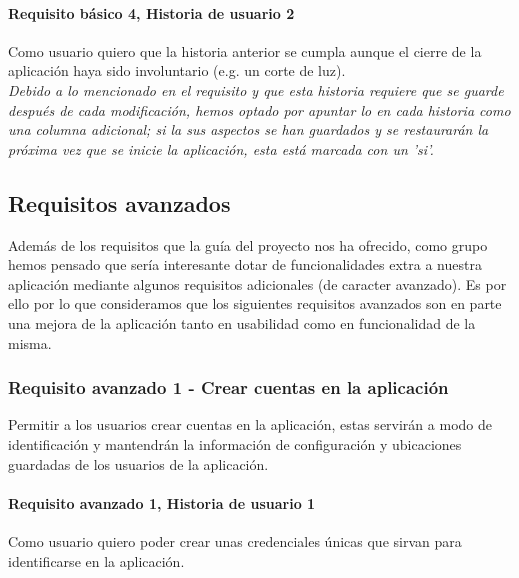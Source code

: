 \documentclass[../ei103948-project-documentation.tex]{subfiles}
\begin{document}
					\vspace*{5mm}

				\paragraph{Requisito básico 4, Historia de usuario 2}
					Como usuario quiero que la historia anterior se cumpla aunque el cierre de la aplicación haya sido involuntario (e.g. un corte de luz).\\

					\emph{Debido a lo mencionado en el requisito y que esta historia requiere que se guarde después de cada modificación, hemos optado por apuntar lo en cada historia como una columna adicional; si la sus aspectos se han guardados y se restaurarán la próxima vez que se inicie la aplicación, esta está marcada con un 'si'.}

\newpage					
		\subsection{Requisitos avanzados}
			Además de los requisitos que la guía del proyecto nos ha ofrecido, como grupo hemos pensado que sería interesante dotar de funcionalidades extra a nuestra aplicación mediante algunos requisitos adicionales (de caracter avanzado). Es por ello por lo que consideramos que los siguientes requisitos avanzados son en parte una mejora de la aplicación tanto en usabilidad como en funcionalidad de la misma.

			\subsubsection{Requisito avanzado 1 - Crear cuentas en la aplicación}
			Permitir a los usuarios crear cuentas en la aplicación, estas servirán a modo de identificación y mantendrán la información de configuración y ubicaciones guardadas de los usuarios de la aplicación.
				\paragraph{Requisito avanzado 1, Historia de usuario 1}
				Como usuario quiero poder crear unas credenciales únicas que sirvan para identificarse en la aplicación.
\end{document}
